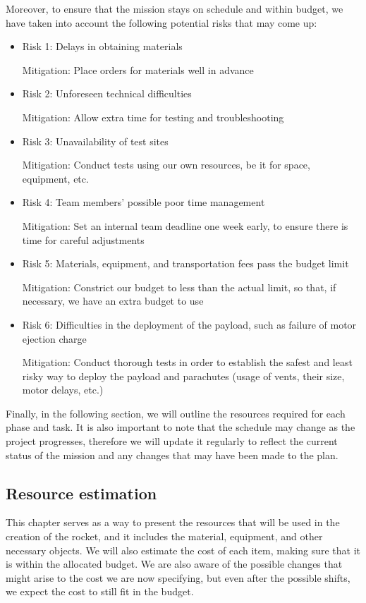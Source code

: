 Moreover, to ensure that the mission stays on schedule and within budget, we have taken into account the following potential risks that may come up:

\begin{itemize}

    \item Risk 1: Delays in obtaining materials
    \par Mitigation: Place orders for materials well in advance
    \item Risk 2: Unforeseen technical difficulties
    \par Mitigation: Allow extra time for testing and troubleshooting
    \item Risk 3: Unavailability of test sites
    \par Mitigation: Conduct tests using our own resources, be it for space, equipment, etc.
    \item Risk 4: Team members' possible poor time management
    \par Mitigation: Set an internal team deadline one week early, to ensure there is time for careful adjustments
    \item Risk 5: Materials, equipment, and transportation fees pass the budget limit
    \par Mitigation: Constrict our budget to less than the actual limit, so that, if necessary, we have an extra budget to use
    \item Risk 6: Difficulties in the deployment of the payload, such as failure of motor ejection charge
    \par Mitigation: Conduct thorough tests in order to establish the safest and least risky way to deploy the payload and parachutes (usage of vents, their size, motor delays, etc.)
\end{itemize}

Finally, in the following section, we will outline the resources required for each phase and task. It is also important to note that the schedule may change as the project progresses, therefore we will update it regularly to reflect the current status of the mission and any changes that may have been made to the plan.

\subsection{Resource estimation}

This chapter serves as a way to present the resources that will be used in the creation of the rocket, and it includes the material, equipment, and other necessary objects. We will also estimate the cost of each item, making sure that it is within the allocated budget. We are also aware of the possible changes that might arise to the cost we are now specifying, but even after the possible shifts, we expect the cost to still fit in the budget.

